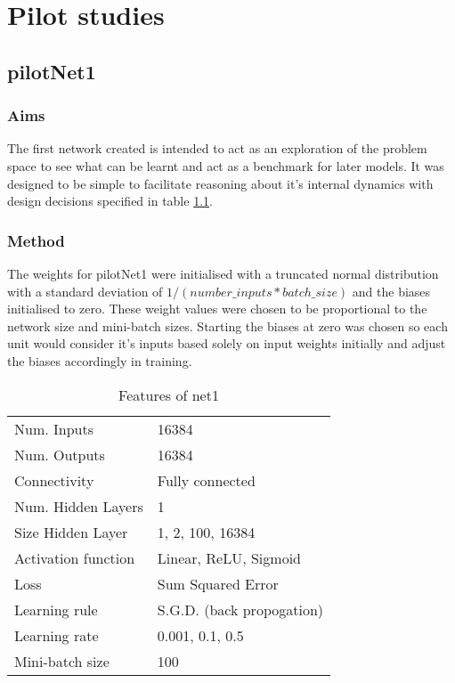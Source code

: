 \chapter{Pilot studies}
\label{ch:pilot}

\section{pilotNet1}


\subsection{Aims}
The first network created is intended to act as an exploration of the problem space to see what can be learnt and act as a benchmark for later models. 
It was designed to be simple to facilitate reasoning about it's internal dynamics with design decisions specified in table \ref{table:net1def}.


\subsection{Method}
The weights for pilotNet1 were initialised with a truncated normal distribution with a standard deviation of $1 / ( number\_inputs * batch\_size )$ and the biases initialised to zero.
These weight values were chosen to be proportional to the network size and mini-batch sizes. 
Starting the biases at zero was chosen so each unit would consider it's inputs based solely on input weights initially and adjust the biases accordingly in training. 

\begin{table}[h]
\centering
\begin{tabular}{ | l | l | }
    \hline
    Num. Inputs & 16384 \\
    Num. Outputs & 16384 \\
    Connectivity & Fully connected \\
    Num. Hidden Layers & 1 \\
    Size Hidden Layer & 1, 2, 100, 16384  \\
    Activation function & Linear, ReLU, Sigmoid \\
    Loss & Sum Squared Error \\
    Learning rule & S.G.D. (back propogation) \\
    Learning rate & 0.001, 0.1, 0.5 \\
    Mini-batch size & 100 \\
    \hline
\end{tabular}
\caption{Features of net1}
\label{table:net1def}
\end{table}

